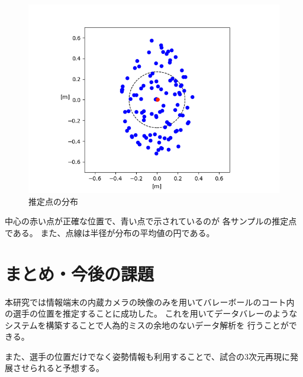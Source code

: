 \documentclass[twoside,twocolumn]{jsarticle}
\begin{document}
    \begin{figure}[h]
        \centering
        \includegraphics[width=0.9\hsize]{conf.png}
        \caption{推定点の分布}
        \label{fig:distribution}
    \end{figure}

    中心の赤い点が正確な位置で、青い点で示されているのが
    各サンプルの推定点である。
    また、点線は半径が分布の平均値の円である。

\section{まとめ・今後の課題}
    本研究では情報端末の内蔵カメラの映像のみを用いてバレーボールのコート内
    の選手の位置を推定することに成功した。
    これを用いてデータバレーのようなシステムを構築することで人為的ミスの余地のないデータ解析を
    行うことができる。

    また、選手の位置だけでなく姿勢情報も利用することで、試合の3次元再現に発展させられると予想する。

\begin{thebibliography}{99}
    \small {
    }
\end{thebibliography}
\end{document}
